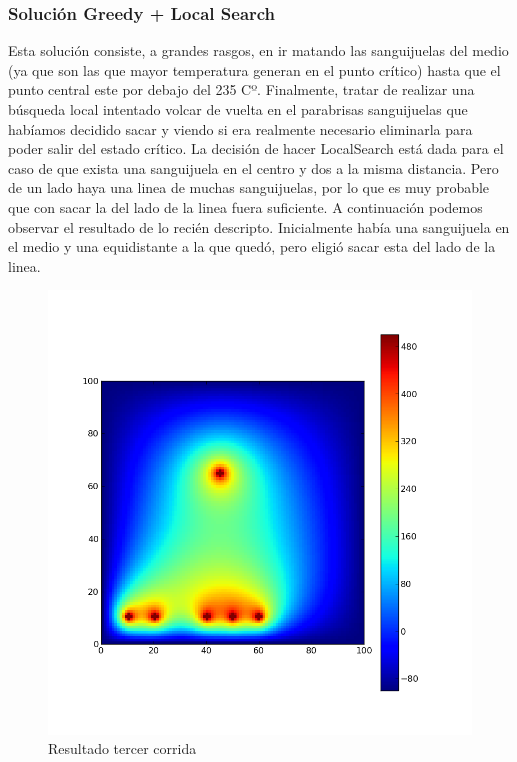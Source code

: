 \subsubsection{Solución Greedy + Local Search}
Esta solución consiste, a grandes rasgos, en ir matando las sanguijuelas del medio (ya que son las que mayor temperatura generan en el punto crítico) hasta que el punto central este por debajo del 235 Cº. Finalmente, tratar de realizar una búsqueda local intentado volcar de vuelta en el parabrisas sanguijuelas que habíamos decidido sacar y viendo si era realmente necesario eliminarla para poder salir del estado crítico. La decisión de hacer LocalSearch está dada para el caso de que exista una sanguijuela en el centro y dos a la misma distancia. Pero de un lado haya una linea de muchas sanguijuelas, por lo que es muy probable que con sacar la del lado de la linea fuera suficiente. A continuación podemos observar el resultado de lo recién descripto. Inicialmente había una sanguijuela en el medio y una equidistante a la que quedó, pero eligió sacar esta del lado de la linea.

\begin{figure}[htb]
\begin{center}
\includegraphics[scale=0.50]{imagenes/greedy_corrido.png} 
\caption{Resultado tercer corrida} 
\end{center}
\end{figure}

